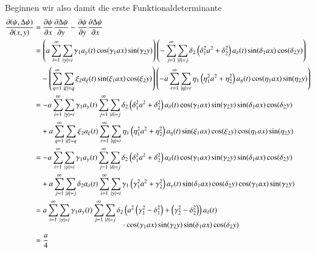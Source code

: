 Beginnen wir also damit die erste Funktionaldeterminante
\begin{align*}
\frac{\partial(\psi, \laplace\psi)}{\partial(x,y)}
&=
\frac{\partial\psi}{\partial x}
\frac{\partial\laplace\psi}{\partial y}
-
\frac{\partial\psi}{\partial y}
\frac{\partial\laplace\psi}{\partial x}
\\
&=
\left(
a
\sum_{i = 1}^{\infty}
\sum_{|\gamma| = i}
\gamma_1
a_{\gamma}(t)
\cos(\gamma_1 ax) \sin(\gamma_2 y)
\right)
\left(
-
\sum_{j = 1}^{\infty}
\sum_{|\delta| = j}
\delta_2
\left(\delta_1^2 a^2 + \delta_2^2 \right)
a_{\delta}(t)
\sin(\delta_1 ax) \cos(\delta_2 y)
\right)
\\
&\phantom{={}}
-
\left(
\sum_{q = 1}^{\infty}
\sum_{|\xi| = q}
\xi_2
a_{\xi}(t)
\sin(\xi_1 ax) \cos(\xi_2 y)
\right)
\left(
-
a
\sum_{r = 1}^{\infty}
\sum_{|\eta| = r}
\eta_1
\left(\eta_1^2 a^2 + \eta_2^2 \right)
a_{\eta}(t)
\cos(\eta_1 ax) \sin(\eta_2 y)
\right)
\\
&=
-
a
\sum_{i = 1}^{\infty}
\sum_{|\gamma| = i}
\gamma_1
a_{\gamma}(t)
\sum_{j = 1}^{\infty}
\sum_{|\delta| = j}
\delta_2
\left(\delta_1^2 a^2 + \delta_2^2 \right)
a_{\delta}(t)
\cos(\gamma_1 ax) \sin(\gamma_2 y)
\sin(\delta_1 ax) \cos(\delta_2 y)
\\
&\phantom{={}}
+
a
\sum_{q = 1}^{\infty}
\sum_{|\xi| = q}
\xi_2
a_{\xi}(t)
\sum_{r = 1}^{\infty}
\sum_{|\eta| = r}
\eta_1
\left(\eta_1^2 a^2 + \eta_2^2 \right)
a_{\eta}(t)
\sin(\xi_1 ax) \cos(\xi_2 y)
\cos(\eta_1 ax) \sin(\eta_2 y)
\\
&=
-
a
\sum_{i = 1}^{\infty}
\sum_{|\gamma| = i}
\gamma_1
a_{\gamma}(t)
\sum_{j = 1}^{\infty}
\sum_{|\delta| = j}
\delta_2
\left(\delta_1^2 a^2 + \delta_2^2 \right)
a_{\delta}(t) 
\cos(\gamma_1 ax) \sin(\gamma_2 y)
\sin(\delta_1 ax) \cos(\delta_2 y)
\\
&\phantom{={}}
+
a
\sum_{j = 1}^{\infty}
\sum_{|\delta| = j}
\delta_2
a_{\delta}(t)
\sum_{i = 1}^{\infty}
\sum_{|\gamma| = i}
\gamma_1
\left(\gamma_1^2 a^2 + \gamma_2^2 \right)
a_{\gamma}(t)
\sin(\delta_1 ax) \cos(\delta_2 y)
\cos(\gamma_1 ax) \sin(\gamma_2 y)
\\
&=
a
\sum_{i = 1}^{\infty}
\sum_{|\gamma| = i}
\gamma_1
a_{\gamma}(t)
\sum_{j = 1}^{\infty}
\sum_{|\delta| = j}
\delta_2
\left(
a^2 \left(\gamma_1^2 - \delta_1^2 \right)
+ \left(\gamma_2^2 - \delta_2^2 \right)
\right)
a_{\delta}(t)
\\[-2ex]
&\phantom{=abbbbb\sum\sum.....{}ccccccc}
\cdot
\cos(\gamma_1 ax) \sin(\gamma_2 y)
\sin(\delta_1 ax) \cos(\delta_2 y)
\\
&=
\frac{a}{4}

\end{align*}
